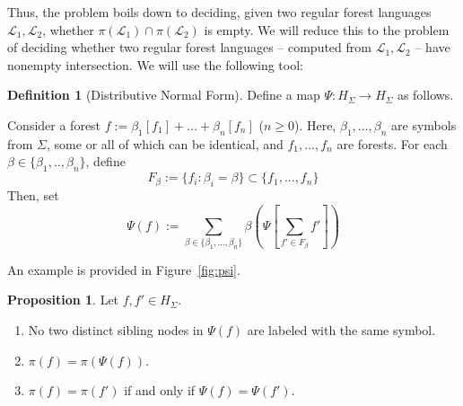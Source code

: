 \documentclass[sigplan,9pt]{acmart}\settopmatter{printfolios=true,printccs=false,printacmref=false}
\newcounter{thm}
\newcounter{theorem}
\theoremstyle{definition}
\newtheorem{defin}[thm]{Definition}
\newtheorem{prop}[thm]{Proposition}
\newtheorem{remark}[thm]{Remark}
\newcommand{\La}[0]{{\mathcal{L}}}
\begin{document}
Thus, the problem boils down to deciding, given two regular forest languages $\La_1, \La_2$, whether $\pi(\La_1) \cap \pi(\La_2)$ is empty.
We will reduce this to the problem of deciding whether two regular forest languages -- computed from $\La_1, \La_2$ -- have nonempty intersection.
We will use the following tool: %
\begin{defin}[Distributive Normal Form]\label{def:psi}
Define a map $\Psi : H_\Sigma \rightarrow H_\Sigma$ as follows.

Consider a forest $f := \beta_1[f_1] + ... + \beta_n[f_n]$ ($n \geq 0$).
Here, $\beta_1, ..., \beta_n$ are symbols from $\Sigma$, some or all of which can be identical, and $f_1, ..., f_n$ are forests.
For each $\beta \in \{\beta_1, .., \beta_n\}$, define \[F_\beta := \{f_i : \beta_i = \beta\} \subset \{f_1, ..., f_n\}\]
Then, set $$\Psi(f) := \sum_{\beta \in \{\beta_1, ..., \beta_n\}} \beta\left(\Psi\left[\sum_{f' \in F_\beta} f'\right]\right)$$


%
%
%
%

\end{defin}


An example is provided in Figure~\ref{fig:psi}.

\begin{prop}\label{prop:psi}
Let $f, f' \in H_\Sigma$.
\begin{enumerate}
\item No two distinct sibling nodes in $\Psi(f)$ are labeled with the same symbol.

\item $\pi(f) = \pi(\Psi(f))$.

\item $\pi(f) = \pi(f')$ if and only if $\Psi(f) = \Psi(f')$.
\end{enumerate}
\end{prop}
\end{document}
